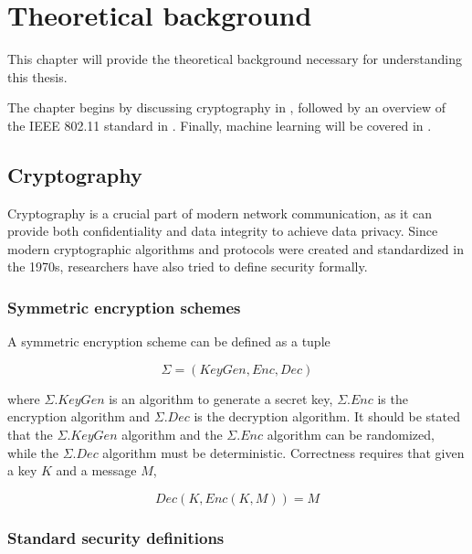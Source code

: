 \chapter[Theoretical background]{Theoretical background\label{ch:background}}

This chapter will provide the theoretical background necessary for understanding this thesis.

The chapter begins by discussing cryptography in , followed by an overview of the IEEE 802.11 standard in . Finally, machine learning will be covered in .

\afterpage{\cfoot{\thepage}}

\clearpage

\section{Cryptography\label{sec:crypto-back}}

Cryptography is a crucial part of modern network communication, as it can provide both confidentiality and data integrity to achieve data privacy. Since modern cryptographic algorithms and protocols were created and standardized in the 1970s, researchers have also tried to define security formally.

\subsection{Symmetric encryption schemes\label{subsec:crypto-back}}

A symmetric encryption scheme can be defined as a tuple

\begin{equation*}
\Sigma = (KeyGen, Enc, Dec)
\end{equation*}

where $\Sigma.KeyGen$ is an algorithm to generate a secret key, $\Sigma.Enc$ is the encryption algorithm and $\Sigma.Dec$ is the decryption algorithm. It should be stated that the $\Sigma.KeyGen$ algorithm and the $\Sigma.Enc$ algorithm can be randomized, while the $\Sigma.Dec$ algorithm must be deterministic. Correctness requires that given a key $K$ and a message $M$,

\begin{equation*}
Dec(K,Enc(K,M)) = M
\end{equation*}

\subsection{Standard security definitions\label{subsec:def-back}}

